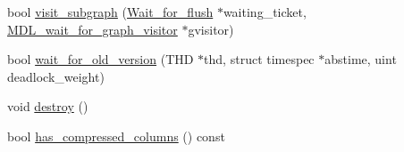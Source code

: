 \begin{DoxyCompactItemize}
\item 
bool \mbox{\hyperlink{structTABLE__SHARE_a084ed977027000a392ff8992d540f257}{visit\+\_\+subgraph}} (\mbox{\hyperlink{classWait__for__flush}{Wait\+\_\+for\+\_\+flush}} $\ast$waiting\+\_\+ticket, \mbox{\hyperlink{classMDL__wait__for__graph__visitor}{M\+D\+L\+\_\+wait\+\_\+for\+\_\+graph\+\_\+visitor}} $\ast$gvisitor)
\item 
bool \mbox{\hyperlink{structTABLE__SHARE_a7570f5c5956dfda8b27bef43e24492d5}{wait\+\_\+for\+\_\+old\+\_\+version}} (T\+HD $\ast$thd, struct timespec $\ast$abstime, uint deadlock\+\_\+weight)
\item 
void \mbox{\hyperlink{structTABLE__SHARE_a18fb7405f4f0af28970bdcbf85aed419}{destroy}} ()
\item 
bool \mbox{\hyperlink{structTABLE__SHARE_a8fb1d77c5db742bdbaf613c0d7923581}{has\+\_\+compressed\+\_\+columns}} () const
\end{DoxyCompactItemize}
